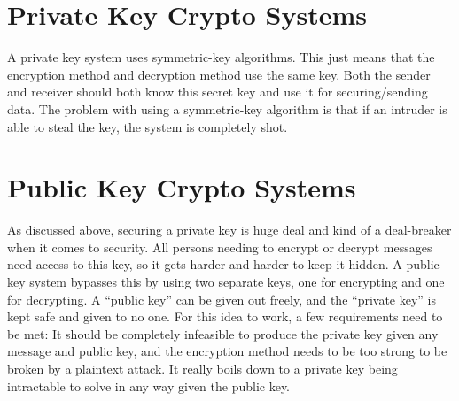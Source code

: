 \documentclass[a4paper,12pt]{article}
\begin{document}
\section*{Private Key Crypto Systems}
A private key system uses symmetric-key algorithms. This just means
that the encryption method and decryption method use the same
key. Both the sender and receiver should both know this secret key and
use it for securing/sending data. The problem with using a
symmetric-key algorithm is that if an intruder is able to steal the
key, the system is completely shot.

\section*{Public Key Crypto Systems}
As discussed above, securing a private key is huge deal and kind of a
deal-breaker when it comes to security. All persons needing to encrypt
or decrypt messages need access to this key, so it gets harder and
harder to keep it hidden. A public key system bypasses this by using
two separate keys, one for encrypting and one for decrypting. A
``public key'' can be given out freely, and the ``private key'' is
kept safe and given to no one. For this idea to work, a few
requirements need to be met: It should be completely infeasible to
produce the private key given any message and public key, and the
encryption method needs to be too strong to be broken by a plaintext
attack. It really boils down to a private key being intractable to
solve in any way given the public key. 
\end{document}
